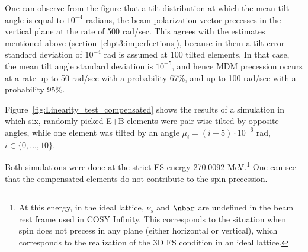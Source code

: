 One can observe from the figure that a tilt distribution at which the mean tilt angle is equal to $10^{-4}$ radians, the
beam polarization vector precesses in the vertical plane at the rate of 500 rad/sec. This agrees with the estimates
mentioned above (section~\ref{chpt3:imperfections}), because in them a tilt error standard deviation of $10^{-4}$ rad 
is assumed at 100 tilted elements. In that case, the mean tilt angle standard deviation is $10^{-5}$, and hence MDM
precession occurs at a rate up to 50 rad/sec with a probability 67\%, and up to 100 rad/sec with a probability 95\%.

Figure~\ref{fig:Linearity_test_compensated} shows the results of a simulation in which six, randomly-picked
E+B elements were pair-wise tilted by opposite angles, while one element was tilted by an angle
$\mu_i = (i-5)\cdot 10^{-6}$ rad, $i\in\lbrace0,\dots,10\rbrace$. 

Both simulations were done at the strict FS energy 270.0092 MeV.\footnote{At this energy, in the ideal lattice, 
	$\nu_s$ and $\nbar$	are undefined in the beam rest frame used in COSY Infinity.
	This corresponds to the situation when spin does not precess in any plane (either horizontal or vertical), 
	which corresponds to the realization of the 3D FS condition in an ideal lattice.} One can see that the compensated
elements do not contribute to the spin precession.

